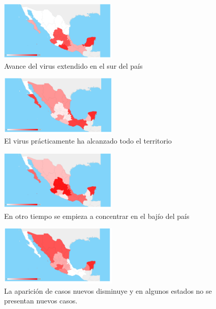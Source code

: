 \begin{figure}[h]
	\centering
	\includegraphics[width=0.5\textwidth]{capitulo2/images/map_images/Captura de pantalla_2020-06-20_15-52-04.png}
	\caption{Avance del virus extendido en el sur del país}
	\label{fig:05_prop}
\end{figure}

\begin{figure}[h]
	\centering
	\includegraphics[width=0.5\textwidth]{capitulo2/images/map_images/Captura de pantalla_2020-06-20_15-51-33.png}
	\caption{El virus prácticamente ha alcanzado todo el territorio}
	\label{fig:02_prop}
\end{figure}
\newpage
\begin{figure}[h]
	\centering
	\includegraphics[width=0.5\textwidth]{capitulo2/images/map_images/Captura de pantalla_2020-06-20_15-51-23.png}
	\caption{En otro tiempo se empieza a concentrar en el bajío del país}
	\label{fig:01_prop}
\end{figure}

\begin{figure}[h]
	\centering
	\includegraphics[width=0.5\textwidth]{capitulo2/images/map_images/Captura de pantalla_2020-06-20_15-51-45.png}
	\caption{La aparición de casos nuevos disminuye y en algunos estados no se presentan nuevos casos.}
	\label{fig:03_prop}
\end{figure}
\newpage

